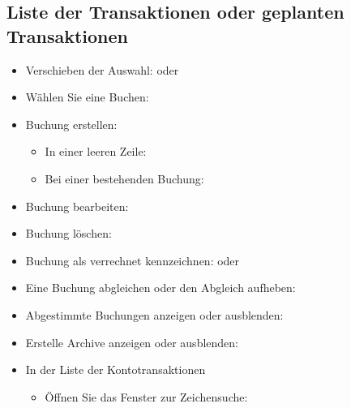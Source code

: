 \subsection{Liste der Transaktionen oder geplanten Transaktionen}

\begin{itemize}
	\item Verschieben der Auswahl: \keys{\arrowkeyup} oder \keys{\arrowkeydown}
	\item Wählen Sie eine Buchen: 
	\item Buchung erstellen:%
	\begin{itemize}
		\item In einer leeren Zeile: 
		\item Bei einer bestehenden Buchung: 
	\end{itemize}
	\item Buchung bearbeiten: 
	\item Buchung löschen: 
	\item Buchung als verrechnet kennzeichnen:  oder 
	\item Eine Buchung abgleichen oder den Abgleich aufheben: 
	\item Abgestimmte Buchungen anzeigen oder ausblenden: 
	\item Erstelle Archive anzeigen oder ausblenden: 
	\item In der Liste der Kontotransaktionen
	\begin{itemize}
		\item Öffnen Sie das Fenster zur Zeichensuche: 
	\end{itemize}
\end{itemize}

